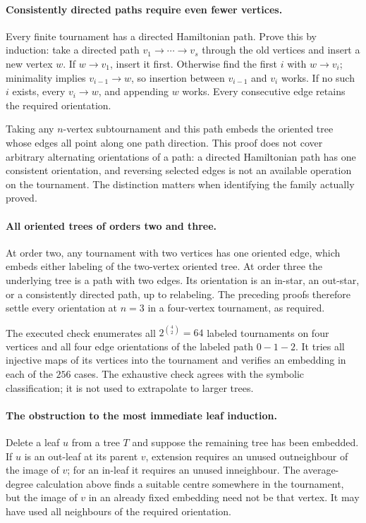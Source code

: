 \documentclass[11pt,a4paper]{article}
\begin{document}
\paragraph{Consistently directed paths require even fewer vertices.}
Every finite tournament has a directed Hamiltonian path. Prove this by
induction: take a directed path $v_1\to\cdots\to v_s$ through the
old vertices and insert a new vertex $w$. If $w\to v_1$, insert it
first. Otherwise find the first $i$ with $w\to v_i$; minimality
implies $v_{i-1}\to w$, so insertion between $v_{i-1}$ and $v_i$
works. If no such $i$ exists, every $v_i\to w$, and appending $w$
works. Every consecutive edge retains the required orientation.

Taking any $n$-vertex subtournament and this path embeds the oriented
tree whose edges all point along one path direction. This proof does
not cover arbitrary alternating orientations of a path: a directed
Hamiltonian path has one consistent orientation, and reversing selected
edges is not an available operation on the tournament. The distinction
matters when identifying the family actually proved.

\paragraph{All oriented trees of orders two and three.}
At order two, any tournament with two vertices has one oriented edge,
which embeds either labeling of the two-vertex oriented tree. At order
three the underlying tree is a path with two edges. Its orientation
is an in-star, an out-star, or a consistently directed path, up to
relabeling. The preceding proofs therefore settle every orientation at
$n=3$ in a four-vertex tournament, as required.

The executed check enumerates all $2^{\binom42}=64$ labeled tournaments
on four vertices and all four edge orientations of the labeled path
$0-1-2$. It tries all injective maps of its vertices into the
tournament and verifies an embedding in each of the $256$ cases.
The exhaustive check agrees with the symbolic classification; it is
not used to extrapolate to larger trees.

\paragraph{The obstruction to the most immediate leaf induction.}
Delete a leaf $u$ from a tree $T$ and suppose the remaining tree has
been embedded. If $u$ is an out-leaf at its parent $v$, extension
requires an unused outneighbour of the image of $v$; for an in-leaf
it requires an unused inneighbour. The average-degree calculation
above finds a suitable centre somewhere in the tournament, but the
image of $v$ in an already fixed embedding need not be that vertex.
It may have used all neighbours of the required orientation.
\end{document}
